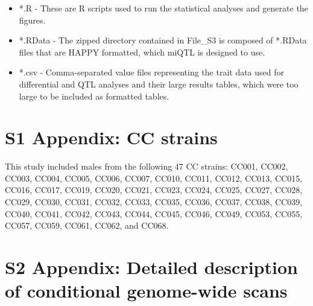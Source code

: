\documentclass[10pt,letterpaper,twoside]{article}
\begin{document}
\begin{itemize}
	\item *.R - These are R scripts used to run the statistical analyses and generate the figures.
	\item *.RData - The zipped directory contained in File\_S3 is composed of *.RData files that are HAPPY formatted, which miQTL is designed to use.
	\item *.csv - Comma-separated value files representing the trait data used for differential and QTL analyses and their large results tables, which were too large to be included as formatted tables.
\end{itemize}

\thispagestyle{empty}
\newpage
\setcounter{page}{1}

\section*{S1 Appendix: CC strains}

This study included males from the following 47 CC strains: CC001, CC002, CC003, CC004, CC005, CC006, CC007, CC010, CC011, CC012, CC013, CC015, CC016, CC017, CC019, CC020, CC021, CC023, CC024, CC025, CC027, CC028, CC029, CC030, CC031, CC032, CC033, CC035, CC036, CC037, CC038, CC039, CC040, CC041, CC042, CC043, CC044, CC045, CC046, CC049, CC053, CC055, CC057, CC059, CC061, CC062, and CC068.

\newpage

\section*{S2 Appendix: Detailed description of conditional genome-wide scans}
\end{document}
